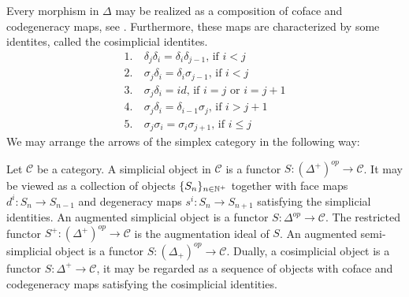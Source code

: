 \documentclass[../thesis.tex]{subfiles}
\begin{document}
            Every morphism in $\Delta$ may be realized as a composition of coface and codegeneracy maps, see \cite{MacLane71}. Furthermore, these maps are characterized by some identites, called the cosimplicial identites. 
            \begin{align*}
                1.&\ \delta_j\delta_i = \delta_i\delta_{j-1} \text{, if }i<j \\
                2.&\ \sigma_j\delta_i = \delta_i\sigma_{j-1} \text{, if }i<j \\
                3.&\ \sigma_j\delta_i = id \text{, if }i=j\text{ or }i=j+1 \\
                4.&\ \sigma_j\delta_i = \delta_{i-1}\sigma_j \text{, if }i>j+1 \\
                5.&\ \sigma_j\sigma_i = \sigma_i\sigma_{j+1} \text{, if }i\leq j
            \end{align*}
            We may arrange the arrows of the simplex category in the following way:
            \begin{center}

            \end{center}

            Let $\mathcal{C}$ be a category. A simplicial object in $\mathcal{C}$ is a functor $S:(\Delta^+)^{op}\rightarrow \mathcal{C}$. It may be viewed as a collection of objects $\{S_n\}_{n\in\mathbb{N}^+}$ together with face maps $d^i:S_n\rightarrow S_{n-1}$ and degeneracy maps $s^i:S_n \rightarrow S_{n+1}$ satisfying the simplicial identities. An augmented simplicial object is a functor $S:\Delta^{op}\rightarrow \mathcal{C}$. The restricted functor $S^+:(\Delta^+)^{op}\rightarrow \mathcal{C}$ is the augmentation ideal of $S$. An augmented semi-simplicial object is a functor $S:(\Delta_+)^{op}\rightarrow \mathcal{C}$. Dually, a cosimplicial object is a functor $S:\Delta^+\rightarrow \mathcal{C}$, it may be regarded as a sequence of objects with coface and codegeneracy maps satisfying the cosimplicial identities.
            
\end{document}
